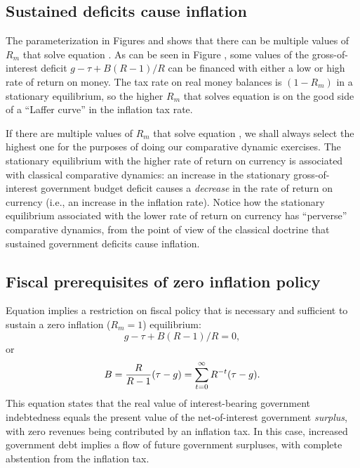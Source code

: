 \subsection{Sustained deficits cause inflation}
The parameterization in Figures  and  %
shows that there can be
multiple values of $R_m$ that solve equation .
As can be seen in Figure , %
 some values of the gross-of-interest deficit
$g - \tau + B(R-1)/R$ can be financed with either a low or high
rate of return on money. The tax rate on real money balances
is $(1-R_m)$ in a stationary equilibrium, so the higher $R_m$ that solves
equation  is on the good side of a ``Laffer curve'' in
the inflation tax rate.


   If there are multiple values of $R_m$ that solve equation
, we
shall always select the highest one for the purposes of doing our
comparative dynamic exercises. %
  The stationary equilibrium with the higher rate of
return on currency is associated with classical comparative dynamics:
an increase in the stationary gross-of-interest government budget
deficit causes a {\it decrease\/} in the rate of return on
currency (i.e., an increase in the inflation rate).  Notice how the
stationary equilibrium associated with the lower rate of return on
currency  has ``perverse'' comparative dynamics, from the point of view
of the classical doctrine that sustained government deficits
cause inflation.
  
  
  
\subsection{Fiscal prerequisites of zero inflation policy}
 Equation  implies a restriction on fiscal policy that
is necessary and sufficient to sustain a zero inflation ($R_m = 1$)
equilibrium:
$$ g - \tau + B (R-1)/R =0 ,$$
or
$$ B = {R \over R-1} (\tau -g) = \sum_{t=0}^\infty R^{-t} (\tau -g).$$
This equation states that the real value of interest-bearing
government indebtedness equals the present value of the net-of-interest
 government {\it surplus}, with zero revenues being contributed by
an inflation tax. In this case, increased government debt implies a flow
of future government
surpluses, with complete abstention from the inflation tax.
